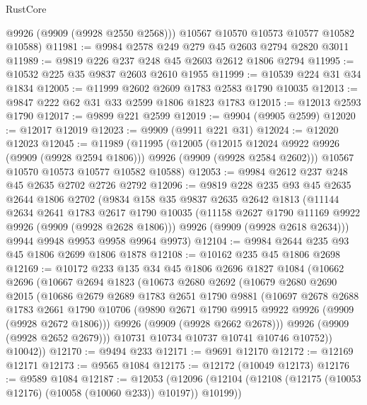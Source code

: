 \begin{lexlean}{RustCore}
\begin{coremodule}
        @9926
        (@9909 (@9928 @2550 @2568)))
      @10567
      @10570
      @10573
      @10577
      @10582
      @10588)
@11981 := @9984 @2578 @249 @279 @45 @2603 @2794 @2820 @3011
@11989 := @9819 @226 @237 @248 @45 @2603 @2612 @1806 @2794
@11995 := @10532 @225 @35 @9837 @2603 @2610 @1955
@11999 := @10539 @224 @31 @34 @1834
@12005 := @11999 @2602 @2609 @1783 @2583 @1790 @10035
@12013 := @9847 @222 @62 @31 @33 @2599 @1806 @1823 @1783
@12015 := @12013 @2593 @1790
@12017 := @9899 @221 @2599
@12019 := @9904 (@9905 @2599)
@12020 := @12017 @12019
@12023 := @9909 (@9911 @221 @31)
@12024 := @12020 @12023
@12045 := @11989
    (@11995
      (@12005
        (@12015 @12024 @9922 @9926 (@9909 (@9928 @2594 @1806)))
        @9926
        (@9909 (@9928 @2584 @2602)))
      @10567
      @10570
      @10573
      @10577
      @10582
      @10588)
@12053 := @9984 @2612 @237 @248 @45 @2635 @2702 @2726 @2792
@12096 := @9819
    @228
    @235
    @93
    @45
    @2635
    @2644
    @1806
    @2702
    (@9834
      @158
      @35
      @9837
      @2635
      @2642
      @1813
      (@11144
        @2634
        @2641
        @1783
        @2617
        @1790
        @10035
        (@11158 @2627 @1790 @11169 @9922 @9926 (@9909 (@9928 @2628 @1806)))
        @9926
        (@9909 (@9928 @2618 @2634)))
      @9944
      @9948
      @9953
      @9958
      @9964
      @9973)
@12104 := @9984 @2644 @235 @93 @45 @1806 @2699 @1806 @1878
@12108 := @10162 @235 @45 @1806 @2698
@12169 := @10172
    @233
    @135
    @34
    @45
    @1806
    @2696
    @1827
    @1084
    (@10662
      @2696
      (@10667
        @2694
        @1823
        (@10673
          @2680
          @2692
          (@10679
            @2680
            @2690
            @2015
            (@10686
              @2679
              @2689
              @1783
              @2651
              @1790
              @9881
              (@10697
                @2678
                @2688
                @1783
                @2661
                @1790
                @10706
                (@9890 @2671 @1790 @9915 @9922 @9926 (@9909 (@9928 @2672 @1806)))
                @9926
                (@9909 (@9928 @2662 @2678)))
              @9926
              (@9909 (@9928 @2652 @2679)))
            @10731
            @10734
            @10737
            @10741
            @10746
            @10752))
        @10042))
@12170 := @9494 @233
@12171 := @9691 @12170
@12172 := @12169 @12171
@12173 := @9565 @1084
@12175 := @12172 (@10049 @12173)
@12176 := @9589 @1084
@12187 := @12053
    (@12096 (@12104 (@12108 (@12175 (@10053 @12176) (@10058 (@10060 @233)) @10197)) @10199))

\end{coremodule}
\end{lexlean}
